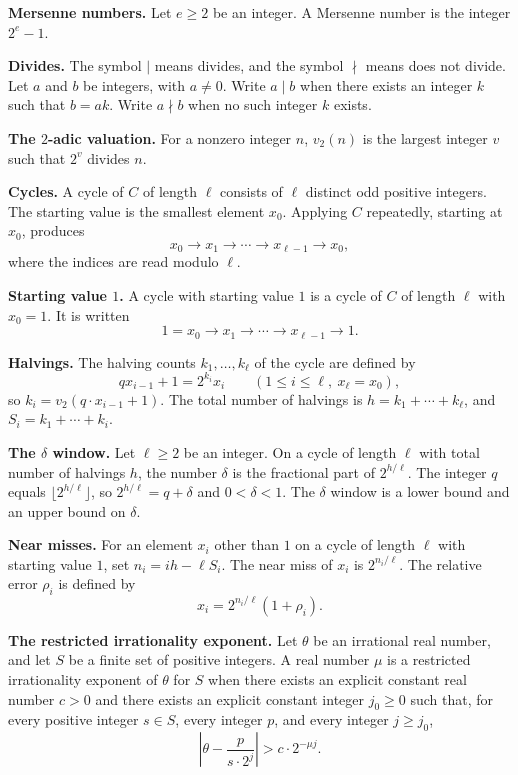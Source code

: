 \documentclass[11pt]{article}
\newcommand{\topic}[1]{\par\noindent\textbf{#1}}
\begin{document}
\topic{Mersenne numbers.}
Let $e \ge 2$ be an integer.
A Mersenne number is the integer $2^e - 1$.

\topic{Divides.}
The symbol $\mid$ means divides, and the symbol $\nmid$ means does not divide.
Let $a$ and $b$ be integers, with $a \ne 0$.
Write $a \mid b$ when there exists an integer $k$ such that $b = ak$.
Write $a \nmid b$ when no such integer $k$ exists.

\topic{The $2$-adic valuation.}
For a nonzero integer $n$, $v_2(n)$ is the largest integer $v$ such that $2^v$ divides $n$.

\topic{Cycles.}
A cycle of $C$ of length $\ell$ consists of $\ell$ distinct odd positive integers.
The starting value is the smallest element $x_0$.
Applying $C$ repeatedly, starting at $x_0$, produces
\[
x_0 \to x_1 \to \cdots \to x_{\ell-1} \to x_0,
\]
where the indices are read modulo $\ell$.

\topic{Starting value $1$.}
A cycle with starting value $1$ is a cycle of $C$ of length $\ell$ with $x_0 = 1$.
It is written
\[
1 = x_0 \to x_1 \to \cdots \to x_{\ell-1} \to 1.
\]

\topic{Halvings.}
The halving counts $k_1, \ldots, k_\ell$ of the cycle are defined by
\[
q x_{i-1} + 1 = 2^{k_i} x_i
\qquad (1 \le i \le \ell,\ x_\ell = x_0),
\]
so $k_i = v_2(q \cdot x_{i-1} + 1)$.
The total number of halvings is $h = k_1 + \cdots + k_\ell$, and $S_i = k_1 + \cdots + k_i$.

\topic{The $\delta$ window.}
Let $\ell \ge 2$ be an integer.
On a cycle of length $\ell$ with total number of halvings $h$, the number $\delta$ is the fractional part of $2^{h/\ell}$.
The integer $q$ equals $\lfloor 2^{h/\ell} \rfloor$, so $2^{h/\ell} = q + \delta$ and $0 < \delta < 1$.
The $\delta$ window is a lower bound and an upper bound on $\delta$.

\topic{Near misses.}
For an element $x_i$ other than $1$ on a cycle of length $\ell$ with starting value $1$, set $n_i = ih - \ell S_i$.
The near miss of $x_i$ is $2^{n_i/\ell}$.
The relative error $\rho_i$ is defined by
\[
x_i = 2^{n_i/\ell}(1 + \rho_i).
\]

\topic{The restricted irrationality exponent.}
Let $\theta$ be an irrational real number, and let $S$ be a finite set of positive integers.
A real number $\mu$ is a restricted irrationality exponent of $\theta$ for $S$ when there exists an explicit constant real number $c > 0$ and there exists an explicit constant integer $j_0 \ge 0$ such that, for every positive integer $s \in S$, every integer $p$, and every integer $j \ge j_0$,
\[
\left|\theta - \frac{p}{s \cdot 2^j}\right| > c \cdot 2^{-\mu j}.
\]
\end{document}
